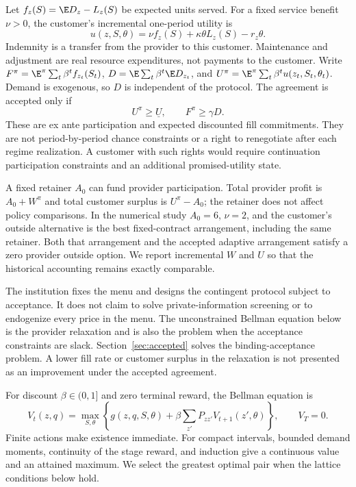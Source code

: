Let $f_z(S)=\E D_z-L_z(S)$ be expected units served. For a fixed service benefit $\nu>0$, the customer's incremental one-period utility is
\begin{equation}\label{eq:customer}
 u(z,S,\theta)=\nu f_z(S)+\kappa\theta L_z(S)-r_z\theta.
\end{equation}
Indemnity is a transfer from the provider to this customer. Maintenance and adjustment are real resource expenditures, not payments to the customer. Write $F^\pi=\E^\pi\sum_t\beta^t f_{z_t}(S_t)$, $D=\E\sum_t\beta^t\E D_{z_t}$, and $U^\pi=\E^\pi\sum_t\beta^t u(z_t,S_t,\theta_t)$. Demand is exogenous, so $D$ is independent of the protocol. The agreement is accepted only if
\begin{equation}\label{eq:participation}
 U^\pi\geq\underline U,\qquad F^\pi\geq\gamma D.
\end{equation}
These are ex ante participation and expected discounted fill commitments. They are not period-by-period chance constraints or a right to renegotiate after each regime realization. A customer with such rights would require continuation participation constraints and an additional promised-utility state.

A fixed retainer $A_0$ can fund provider participation. Total provider profit is $A_0+W^\pi$ and total customer surplus is $U^\pi-A_0$; the retainer does not affect policy comparisons. In the numerical study $A_0=6$, $\nu=2$, and the customer's outside alternative is the best fixed-contract arrangement, including the same retainer. Both that arrangement and the accepted adaptive arrangement satisfy a zero provider outside option. We report incremental $W$ and $U$ so that the historical accounting remains exactly comparable.

The institution fixes the menu and designs the contingent protocol subject to acceptance. It does not claim to solve private-information screening or to endogenize every price in the menu. The unconstrained Bellman equation below is the provider relaxation and is also the problem when the acceptance constraints are slack. Section~\ref{sec:accepted} solves the binding-acceptance problem. A lower fill rate or customer surplus in the relaxation is not presented as an improvement under the accepted agreement.

For discount $\beta\in(0,1]$ and zero terminal reward, the Bellman equation is
\begin{equation}\label{eq:bellman}
 V_t(z,q)=\max_{S,\theta}\left\{g(z,q,S,\theta)
       +\beta\sum_{z'}P_{zz'}V_{t+1}(z',\theta)\right\},\qquad V_T=0.
\end{equation}
Finite actions make existence immediate. For compact intervals, bounded demand moments, continuity of the stage reward, and induction give a continuous value and an attained maximum. We select the greatest optimal pair when the lattice conditions below hold.

